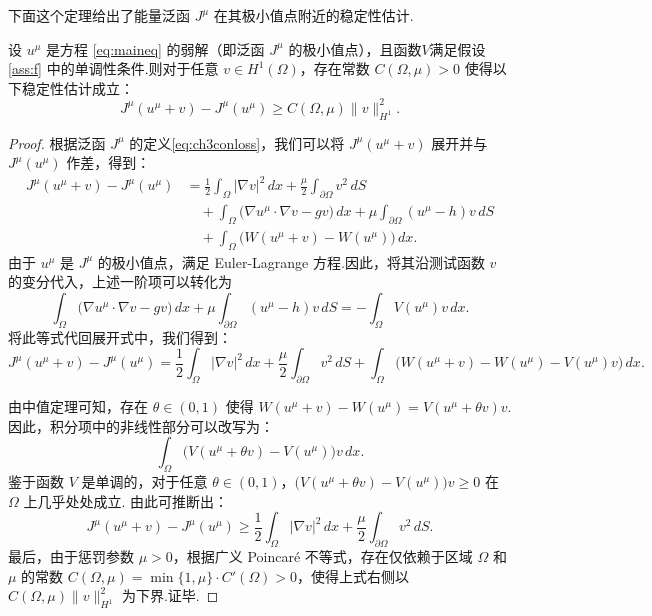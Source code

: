 下面这个定理给出了能量泛函 $J^{\mu}$ 在其极小值点附近的稳定性估计.
\begin{theorem}[稳定性估计]\label{thm:staerr}
设 $u^{\mu}$ 是方程 \eqref{eq:maineq} 的弱解（即泛函 $J^{\mu}$ 的极小值点），且函数$V$满足假设 \ref{ass:f} 中的单调性条件.则对于任意 $v \in H^1(\Omega)$，存在常数 $C(\Omega,\mu)>0$ 使得以下稳定性估计成立：
\begin{equation}\label{eq:stability}
J^{\mu}(u^{\mu}+v)-J^{\mu}(u^{\mu}) \geq C(\Omega,\mu)\|v\|_{H^{1}}^{2}.
\end{equation}
\end{theorem}
\begin{proof}
根据泛函 $J^{\mu}$ 的定义\eqref{eq:ch3conloss}，我们可以将 $J^{\mu}(u^{\mu}+v)$ 展开并与 $J^{\mu}(u^{\mu})$ 作差，得到：
\begin{equation*}
\begin{aligned}
J^{\mu}(u^{\mu}+v) - J^{\mu}(u^{\mu}) 
&= \frac{1}{2}\int_{\Omega} |\nabla v|^2 \, dx + \frac{\mu}{2}\int_{\partial \Omega} v^2 \, dS \\
&\quad + \int_{\Omega} \big( \nabla u^{\mu} \cdot \nabla v - gv \big) \, dx + \mu \int_{\partial \Omega} (u^{\mu}-h) v \, dS \\
&\quad + \int_{\Omega} \big( W(u^{\mu}+v) - W(u^{\mu}) \big) \, dx.
\end{aligned}
\end{equation*}
由于 $u^{\mu}$ 是 $J^{\mu}$ 的极小值点，满足 Euler-Lagrange 方程.因此，将其沿测试函数 $v$ 的变分代入，上述一阶项可以转化为
\begin{equation*}
\int_{\Omega} \big( \nabla u^{\mu} \cdot \nabla v - gv \big) \, dx + \mu \int_{\partial \Omega} (u^{\mu}-h) v \, dS = -\int_{\Omega} V(u^{\mu})v \, dx.
\end{equation*}
将此等式代回展开式中，我们得到：
\begin{equation*}
J^{\mu}(u^{\mu}+v) - J^{\mu}(u^{\mu}) = \frac{1}{2}\int_{\Omega} |\nabla v|^2 \, dx + \frac{\mu}{2}\int_{\partial \Omega} v^2 \, dS + \int_{\Omega} \big( W(u^{\mu}+v) - W(u^{\mu}) - V(u^{\mu})v \big) \, dx.
\end{equation*}

由中值定理可知，存在 $\theta \in (0,1)$ 使得 $W(u^{\mu}+v) - W(u^{\mu}) = V(u^{\mu}+\theta v)v$.因此，积分项中的非线性部分可以改写为：
\begin{equation*}
\int_{\Omega} \big( V(u^{\mu}+\theta v) - V(u^{\mu}) \big) v \, dx.
\end{equation*}
鉴于函数 $V$ 是单调的，对于任意 $\theta \in (0,1)$，$\big( V(u^{\mu}+\theta v) - V(u^{\mu}) \big) v \geq 0$ 在 $\Omega$ 上几乎处处成立.
由此可推断出：
\begin{equation*}
J^{\mu}(u^{\mu}+v) - J^{\mu}(u^{\mu}) \geq \frac{1}{2}\int_{\Omega} |\nabla v|^2 \, dx + \frac{\mu}{2} \int_{\partial \Omega} v^2 \, dS.
\end{equation*}
最后，由于惩罚参数 $\mu > 0$，根据广义 Poincaré 不等式，存在仅依赖于区域 $\Omega$ 和 $\mu$ 的常数 $C(\Omega,\mu)=\min\{1,\mu\}\cdot C'(\Omega)>0$，使得上式右侧以 $C(\Omega,\mu)\|v\|_{H^{1}}^{2}$ 为下界.证毕.
\end{proof}


